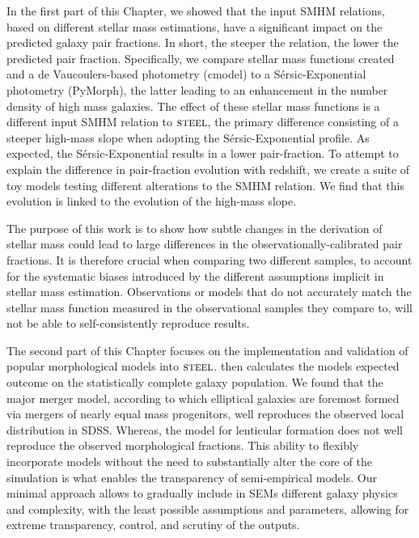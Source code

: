 In the first part of this Chapter, we showed that the input SMHM relations, based on different stellar mass estimations, have a significant impact on the predicted galaxy pair fractions. In short, the steeper the relation, the lower the predicted pair fraction. Specifically, we compare stellar mass functions created and a de Vaucoulers-based photometry (cmodel) to a S\'ersic-Exponential photometry (PyMorph), the latter leading to an enhancement in the number density of high mass galaxies. The effect of these stellar mass functions is a different input SMHM relation to $\textsc{steel}$, the primary difference consisting of a steeper high-mass slope when adopting the S\'ersic-Exponential profile. As expected, the S\'ersic-Exponential results in a lower pair-fraction. To attempt to explain the difference in pair-fraction evolution with redshift, we create a suite of toy models testing different alterations to the SMHM relation. We find that this evolution is linked to the evolution of the high-mass slope.

The purpose of this work is to show how subtle changes in the derivation of stellar mass could lead to large differences in the observationally-calibrated pair fractions. It is therefore crucial when comparing two different samples, to account for the systematic biases introduced by the different assumptions implicit in stellar mass estimation. Observations or models that do not accurately match the stellar mass function measured in the observational samples they compare to, will not be able to self-consistently reproduce results.

The second part of this Chapter focuses on the implementation and validation of popular morphological models into $\textsc{steel}$. \steel then calculates the models expected outcome on the statistically complete galaxy population. We found that the major merger model, according to which elliptical galaxies are foremost formed via mergers of nearly equal mass progenitors, well reproduces the observed local distribution in SDSS. Whereas, the \citet{Cook2009Two-phaseFormation} model for lenticular formation does not well reproduce the observed morphological fractions. This ability to flexibly incorporate models without the need to substantially alter the core of the simulation is what enables the transparency of semi-empirical models. Our minimal approach allows to gradually include in SEMs different galaxy physics and complexity, with the least possible assumptions and parameters, allowing for extreme transparency, control, and scrutiny of the outputs.

